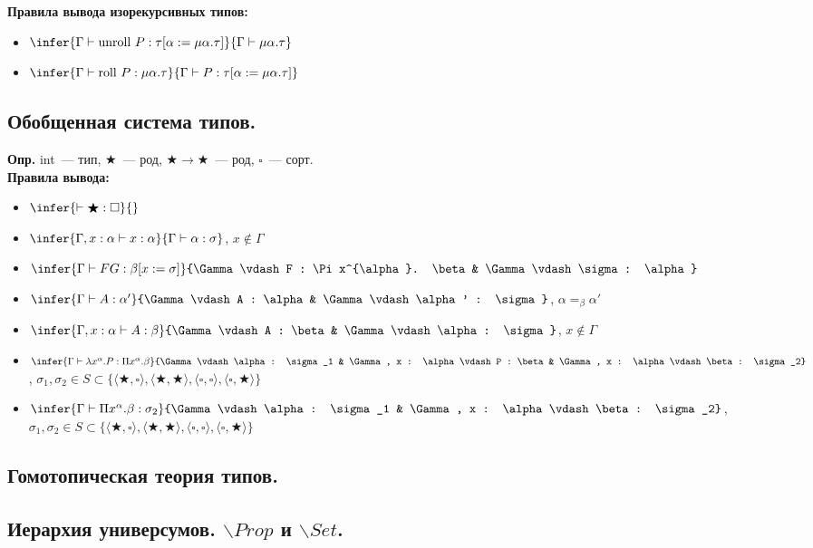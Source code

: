 \documentclass{article}
\begin{document}
	\textbf{Правила вывода изорекурсивных типов:}
	\begin{itemize}
		\item $\infer{\Gamma \vdash \text{unroll } P : \tau [\alpha := \mu \alpha. \tau]}{\Gamma \vdash \mu \alpha. \tau}$
		\item $\infer{\Gamma \vdash \text{roll } P : \mu \alpha. \tau}{\Gamma \vdash P : \tau [\alpha := \mu \alpha. \tau]}$
	\end{itemize}
	\subsection{Обобщенная система типов.}
	\textbf{Опр.} int~--- тип, $\bigstar$~--- род, $\bigstar \rightarrow \bigstar$~--- род, $\square$~--- сорт. \\
	\textbf{Правила вывода:}
	\begin{itemize}
		\item $\infer{\vdash \bigstar : \square}{}$
		\item $\infer{\Gamma, x : \alpha \vdash x : \alpha}{\Gamma \vdash \alpha : \sigma}$, $x \not\in \Gamma$
		\item $\infer{\Gamma \vdash FG : \beta [x := \sigma]}{\Gamma \vdash F : \Pi x^{\alpha}. \beta & \Gamma \vdash \sigma : \alpha}$
		\item $\infer{\Gamma \vdash A : \alpha'}{\Gamma \vdash A : \alpha & \Gamma \vdash \alpha' : \sigma}$, $\alpha =_{\beta} \alpha'$
		\item $\infer{\Gamma, x : \alpha \vdash A : \beta}{\Gamma \vdash A : \beta & \Gamma \vdash \alpha : \sigma}$, $x \not\in \Gamma$
		\item $\infer{\Gamma \vdash \lambda x^{\alpha}. P : \Pi x^{\alpha}. \beta}{\Gamma \vdash \alpha : \sigma_1 & \Gamma, x : \alpha \vdash P : \beta & \Gamma, x : \alpha \vdash \beta : \sigma_2}$, $\sigma_1, \sigma_2 \in S \subset \{ \langle \bigstar, \square \rangle, \langle \bigstar, \bigstar \rangle, \langle \square, \square \rangle, \langle \square, \bigstar \rangle \}$
		\item $\infer{\Gamma \vdash \Pi x^{\alpha}. \beta : \sigma_2}{\Gamma \vdash \alpha : \sigma_1 & \Gamma, x : \alpha \vdash \beta : \sigma_2}$, $\sigma_1, \sigma_2 \in S \subset \{ \langle \bigstar, \square \rangle, \langle \bigstar, \bigstar \rangle, \langle \square, \square \rangle, \langle \square, \bigstar \rangle \}$
	\end{itemize}
	\subsection{Гомотопическая теория типов.}
	\subsection{Иерархия универсумов. $\backslash Prop$ и $\backslash Set$.}
\end{document}

